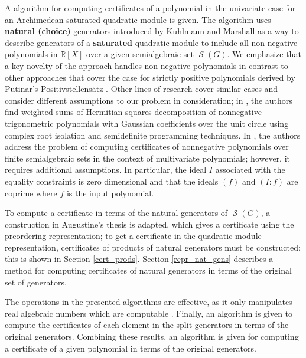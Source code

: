 \documentclass[preprint,12pt,authoryear]{elsarticle}
\newcommand{\rX}{\mathbb{R}[X]}
\DeclareMathOperator{\semialgebraic}{\mathcal{S}}
\begin{document}
A algorithm for computing certificates of a polynomial in the univariate case
for an Archimedean saturated quadratic module is given. The algorithm uses {\bf
  natural (choice)} generators introduced by Kuhlmann and Marshall
\cite{marshall2002,marshall2005, marshallbooksos} as a way to describe
generators of a \textbf{saturated} quadratic module to include all 
non-negative polynomials in $\rX$ over a given semialgebraic set
$\semialgebraic(G)$. We emphasize that a key novelty of the approach handles
non-negative polynomials in contrast to other approaches \cite{MAGRON2021221,
  Baldi2023DegreeBF, Baldi_2022, SCHWEIGHOFER2002307, 10.1007/s10957-012-0261-9}
that cover the case for strictly positive polynomials derived by Putinar's
Positivstellens\"atz \cite{10.2307/24897130}. Other lines of research cover
similar cases and consider different assumptions to our problem in
consideration; in \cite{10.1145/3476446.3535480}, the authors find weighted sums
of Hermitian squares decomposition of nonnegative trigonometric polynomials with
Gaussian coefficients over the unit circle using complex root isolation and
semidefinite programming techniques.  In \cite{baldi2024effective}, the authors
address the problem of computing certificates of nonnegative polynomials over
finite semialgebraic sets in the context of multivariate polynomials; however, it 
requires additional assumptions. In particular, the ideal $I$ associated with
the equality constraints is zero dimensional and that the ideals $(f)$ and
$(I : f)$ are coprime where $f$ is the input polynomial.

To compute a certificate in terms of the natural generators of
$\semialgebraic(G)$, a construction in Augustine's
thesis\cite{Augustin2008TheMP} is adapted, which gives a certificate using the
preordering representation; to get a certificate in the quadratic module
representation, certificates of products of natural generators must be
constructed; this is shown in Section \ref{cert_prods}.  Section
\ref{repr_nat_gens} describes a method for computing certificates of natural
generators in terms of the original set of generators.

The operations in the presented algorithms are effective, as it only manipulates
real algebraic numbers which are computable \cite{L70c,
  10.5555/1197095}. Finally, an algorithm is given to compute the certificates
of each element in the split generators in terms of the original
generators. Combining these results, an algorithm is given for computing a
certificate of a given polynomial in terms of the original generators.
\end{document}
